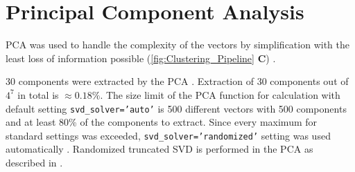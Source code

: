\section{Principal Component Analysis} \label{sec:PCA}

\gls{PCA} was used to handle the complexity of the vectors by simplification with the least loss of information possible (\autoref{fig:Clustering_Pipeline} \textsf{\textbf{C}}) \autocite{pearson_liii_1901}.%



30 components were extracted by the PCA \autocite{pedregosa_scikit-learn_2011}. Extraction of 30 components out of $4^7$ in total is $\approx 0.18\%$. The size limit of the PCA function for calculation with default setting \texttt{svd\_solver='auto'} is 500 different vectors with 500 components and at least 80\% of the components to extract. Since every maximum for standard settings was exceeded, \texttt{svd\_solver='randomized'} setting was used automatically \autocite{pedregosa_scikit-learn_2011}. Randomized truncated \gls{SVD} is performed in the PCA as described in \textcite{halko_finding_2010}.



